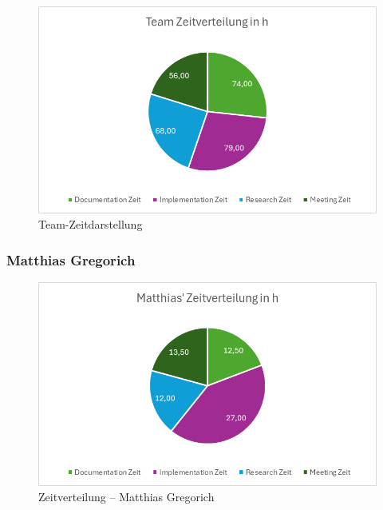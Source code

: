 \documentclass{article}
\begin{document}
\begin{figure}[H]
  \centering
  \includegraphics[width=\textwidth]{Team_Zeitdarstellung.png}
  \caption{Team-Zeitdarstellung}
  \label{fig:team-zeitdarstellung}
\end{figure}



\subsubsection*{Matthias Gregorich}

\begin{figure}[H]
  \centering
  \includegraphics[width=\textwidth]{Matthias_Zeitverteilung.png}
  \caption{Zeitverteilung – Matthias Gregorich}
  \label{fig:matthias-zeitverteilung}
\end{figure}
\end{document}
